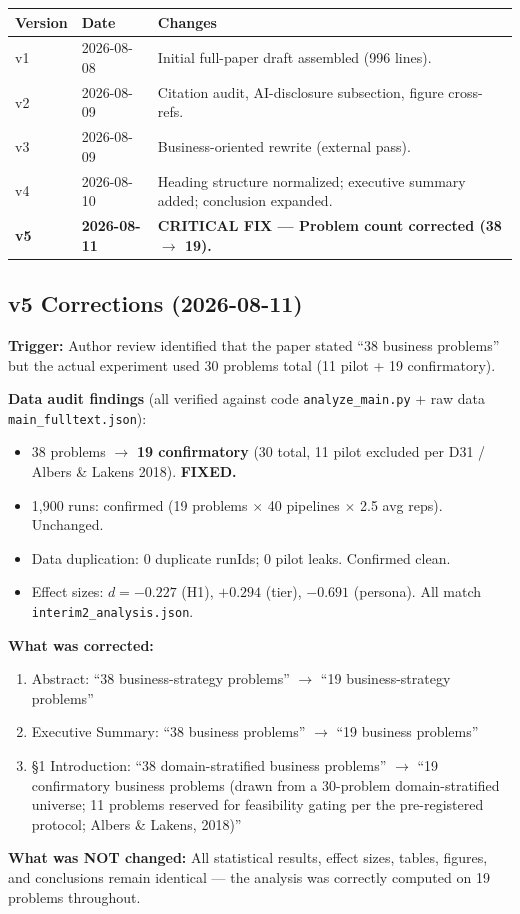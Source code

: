 \documentclass[12pt,a4paper]{article}
\begin{document}
\begin{table}[h]
\centering
\small
\begin{tabular}{llp{9cm}}
\toprule
Version & Date & Changes \\
\midrule
v1 & 2026-08-08 & Initial full-paper draft assembled (996 lines). \\
v2 & 2026-08-09 & Citation audit, AI-disclosure subsection, figure cross-refs. \\
v3 & 2026-08-09 & Business-oriented rewrite (external pass). \\
v4 & 2026-08-10 & Heading structure normalized; executive summary added; conclusion expanded. \\
\textbf{v5} & \textbf{2026-08-11} & \textbf{CRITICAL FIX --- Problem count corrected (38 $\to$ 19).} \\
\bottomrule
\end{tabular}
\end{table}

\subsection*{v5 Corrections (2026-08-11)}

\textbf{Trigger:} Author review identified that the paper stated ``38 business problems''
but the actual experiment used 30 problems total (11 pilot + 19 confirmatory).

\textbf{Data audit findings} (all verified against code \texttt{analyze\_main.py} + raw data
\texttt{main\_fulltext.json}):
\begin{itemize}
  \item 38 problems $\to$ \textbf{19 confirmatory} (30 total, 11 pilot excluded per D31 / Albers \& Lakens 2018). \textbf{FIXED.}
  \item 1,900 runs: confirmed (19 problems $\times$ 40 pipelines $\times$ 2.5 avg reps). Unchanged.
  \item Data duplication: 0 duplicate runIds; 0 pilot leaks. Confirmed clean.
  \item Effect sizes: $d = -0.227$ (H1), $+0.294$ (tier), $-0.691$ (persona). All match \texttt{interim2\_analysis.json}.
\end{itemize}

\textbf{What was corrected:}
\begin{enumerate}
  \item Abstract: ``38 business-strategy problems'' $\to$ ``19 business-strategy problems''
  \item Executive Summary: ``38 business problems'' $\to$ ``19 business problems''
  \item \S 1 Introduction: ``38 domain-stratified business problems'' $\to$ ``19 confirmatory business problems (drawn from a 30-problem domain-stratified universe; 11 problems reserved for feasibility gating per the pre-registered protocol; Albers \& Lakens, 2018)''
\end{enumerate}

\textbf{What was NOT changed:} All statistical results, effect sizes, tables, figures, and
conclusions remain identical --- the analysis was correctly computed on 19 problems throughout.
\end{document}
